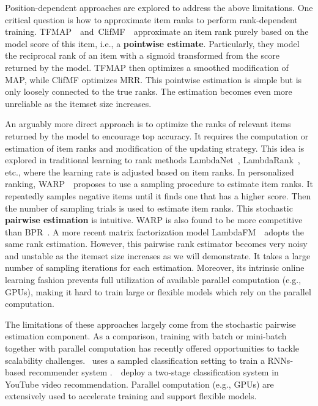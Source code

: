 \documentclass[letterpaper]{article} %
\begin{document}
Position-dependent approaches are explored to address the above limitations. One critical question is how to approximate item ranks to perform rank-dependent training. TFMAP~\cite{shi2012tfmap}~and~ClifMF~\cite{shi2012climf}~approximate an item rank purely based on the model score of this item, i.e., a \textbf{pointwise estimate}. Particularly, they model the reciprocal rank of an item with a sigmoid transformed from the score returned by the model. TFMAP then optimizes a smoothed modification of MAP, while ClifMF optimizes MRR. This pointwise estimation is simple but is only loosely connected to the true ranks. The estimation becomes even more unreliable as the itemset size increases.

An arguably more direct approach is to optimize the ranks of relevant items returned by the model to encourage top accuracy. It requires the computation or estimation of item ranks and modification of the updating strategy. This idea is explored in traditional learning to rank methods LambdaNet~\cite{burges2005learning}, LambdaRank~\cite{burges2007learning}, etc., where the learning rate is adjusted based on item ranks. In personalized ranking, WARP~\cite{weston2010large}~proposes to use a sampling procedure to estimate item ranks. It repeatedly samples negative items until it finds one that has a higher score. Then the number of sampling trials is used to estimate item ranks. This stochastic \textbf{pairwise estimation} is intuitive. WARP is also found to be more competitive than BPR~\cite{hong2013co}. A more recent matrix factorization model LambdaFM~\cite{yuan2016lambdafm}~adopts the same rank estimation. However, this pairwise rank estimator becomes very noisy and unstable as the itemset size increases as we will demonstrate. It takes a large number of sampling iterations for each estimation. Moreover, its intrinsic online learning fashion prevents full utilization of available parallel computation (e.g., GPUs), making it hard to train large or flexible models which rely on the parallel computation. 

The limitations of these approaches largely come from the stochastic pairwise estimation component. As a comparison, training with batch or mini-batch together with parallel computation has recently offered opportunities to tackle scalability challenges. \cite{hidasi2015session}~uses a sampled classification setting to train a RNNs-based recommender system .~\cite{covington2016deep}~deploy a two-stage classification system in YouTube video recommendation. Parallel computation (e.g., GPUs) are extensively used to accelerate training and support flexible models.%
\end{document}
